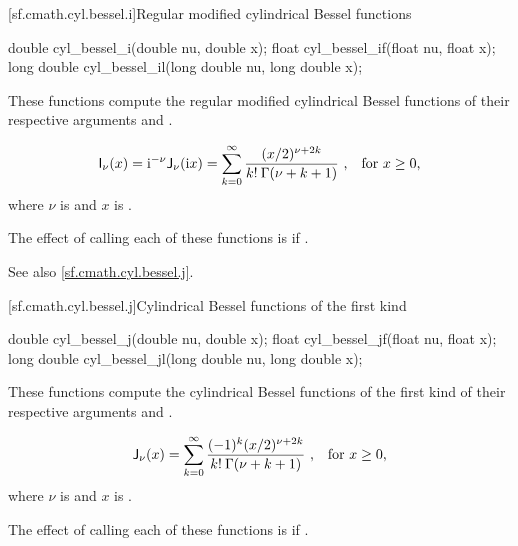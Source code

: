 [sf.cmath.cyl.bessel.i]{Regular modified cylindrical Bessel functions}%
%
%
%
%
%
\begin{itemdecl}
double       cyl_bessel_i(double nu, double x);
float        cyl_bessel_if(float nu, float x);
long double  cyl_bessel_il(long double nu, long double x);
\end{itemdecl}

\begin{itemdescr}
\pnum
\effects
These functions compute
the regular modified cylindrical Bessel functions
of their respective arguments
 and .

\pnum
\returns
\[ \mathsf{I}_\nu(x) =
     \mathrm{i}^{-\nu} \mathsf{J}_\nu(\mathrm{i}x) =
     \sum_{k=0}^\infty \frac{(x/2)^{\nu+2k}}{k! \: \Gamma(\nu+k+1)}
     \text{ ,\quad for $x \ge 0$,} \]
where
$\nu$ is  and
$x$ is .

\pnum
\remarks
The effect of calling each of these functions
is 
if .

\pnum
See also \ref{sf.cmath.cyl.bessel.j}.
\end{itemdescr}

[sf.cmath.cyl.bessel.j]{Cylindrical Bessel functions of the first kind}%
%
%
%
%
%
\begin{itemdecl}
double       cyl_bessel_j(double nu, double x);
float        cyl_bessel_jf(float nu, float x);
long double  cyl_bessel_jl(long double nu, long double x);
\end{itemdecl}

\begin{itemdescr}

\pnum
\effects
These functions compute
the cylindrical Bessel functions of the first kind
of their respective arguments
 and .

\pnum
\returns
\[ \mathsf{J}_\nu(x) =
   \sum_{k=0}^\infty \frac{(-1)^k (x/2)^{\nu+2k}}{k! \: \Gamma(\nu+k+1)}
   \text{ ,\quad for $x \ge 0$,} \]
where
$\nu$ is  and
$x$ is .

\pnum
\remarks
The effect of calling each of these functions
is 
if .
\end{itemdescr}

